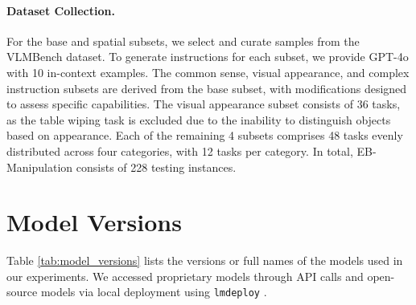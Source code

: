\paragraph{Dataset Collection. }For the base and spatial subsets, we select and curate samples from the VLMBench dataset. 
To generate instructions for each subset, we provide GPT-4o with 10 in-context examples.
The common sense, visual appearance, and complex instruction subsets are derived from the base subset, with modifications designed to assess specific capabilities. The visual appearance subset consists of 36 tasks, as the table wiping task is excluded due to the inability to distinguish objects based on appearance. Each of the remaining 4 subsets comprises 48 tasks evenly distributed across four categories, with 12 tasks per category. In total, EB-Manipulation consists of 228 testing instances.


\section{Model Versions}\label{ap:model_version}
Table \ref{tab:model_versions} lists the versions or full names of the models used in our experiments. We accessed proprietary models through API calls and open-source models via local deployment using \texttt{lmdeploy} \cite{2023lmdeploy}.


